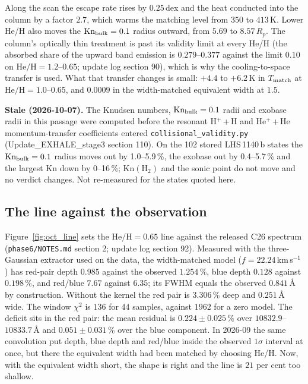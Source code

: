 \documentclass[english,a4paper]{my_memo}
\begin{document}
Along the scan the escape rate rises by $0.25$\,dex and the heat conducted
into the column by a factor $2.7$, which warms the matching level from $350$
to $413$\,K. Lower He/H also moves the $\mathrm{Kn}_{\rm bulk} = 0.1$ radius
outward, from $5.69$ to $8.57\,R_p$. The column's optically thin treatment
is past its validity limit at every He/H (the absorbed share of the upward
band emission is $0.279$--$0.377$ against the limit $0.10$ on
$\mathrm{He/H} = 1.2$--$0.65$; update log section 90), which is why the
cooling-to-space transfer is used. What that transfer changes is small:
$+4.4$ to $+6.2$\,K in $T_{\rm match}$ at $\mathrm{He/H} = 1.0$--$0.65$,
and $0.0009$ in the width-matched equivalent width at $1.5$.

\noindent\textbf{Stale (2026-10-07).} The Knudsen numbers, $\mathrm{Kn}_{\rm bulk}=0.1$ radii and exobase radii in this passage were computed before the resonant H$^+$\,+\,H and He$^+$\,+\,He momentum-transfer coefficients entered \texttt{collisional\_validity.py} (Update\_EXHALE\_stage3 section 110). On the 102 stored LHS\,1140\,b states the $\mathrm{Kn}_{\rm bulk}=0.1$ radius moves out by 1.0--5.9\,\%, the exobase out by 0.4--5.7\,\% and the largest Kn down by 0--16\,\%; $\mathrm{Kn}(\mathrm{H_2})$ and the sonic point do not move and no verdict changes. Not re-measured for the states quoted here.

\subsection{The line against the observation}
\label{sec:oct_line}

Figure~\ref{fig:oct_line} sets the $\mathrm{He/H} = 0.65$ line against the
released C26 spectrum (\texttt{phase6/NOTES.md} section 2; update log
section 92). Measured with the three-Gaussian extractor used on the data,
the width-matched model ($f = 22.24$\,km\,s$^{-1}$) has red-pair depth
$0.985$ against the observed $1.254$\,\%, blue depth $0.128$ against
$0.198$\,\%, and red/blue $7.67$ against $6.35$; its FWHM equals the
observed $0.841$\,\AA{} by construction. Without the kernel the red pair is
$3.306$\,\% deep and $0.251$\,\AA{} wide. The window $\chi^2$ is $136$ for
$44$ samples, against $1962$ for a zero model. The deficit sits in the red
pair: the mean residual is $0.224 \pm 0.025$\,\% over
$10832.9$--$10833.7$\,\AA{} and $0.051 \pm 0.031$\,\% over the blue
component. In 2026-09 the same convolution put depth, blue depth and
red/blue inside the observed $1\sigma$ interval at once, but there the
equivalent width had been matched by choosing He/H. Now, with the
equivalent width short, the shape is right and the line is $21$ per cent too
shallow.
\end{document}
